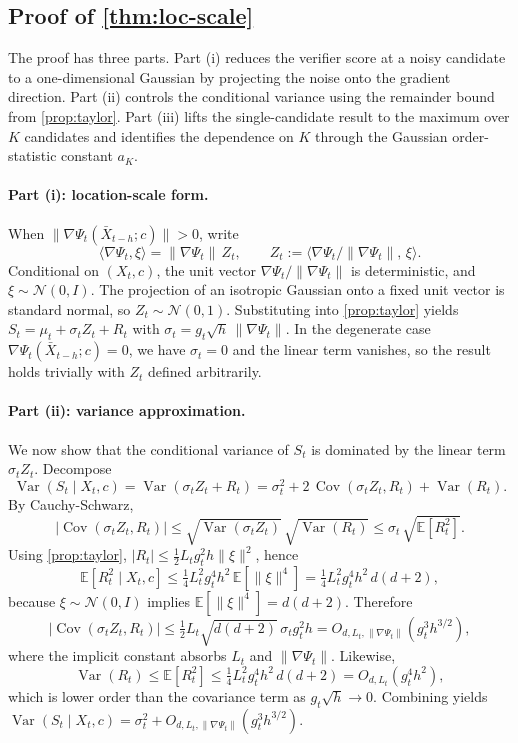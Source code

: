 \subsection{Proof of \texorpdfstring{\cref{thm:loc-scale}}{Theorem 5 (Location-Scale Structure)}}
\label{sec:proof-loc-scale}
%
The proof has three parts. Part (i) reduces the verifier score at a noisy candidate to a one-dimensional Gaussian by projecting the noise onto the gradient direction. Part (ii) controls the conditional variance using the remainder bound from \cref{prop:taylor}. Part (iii) lifts the single-candidate result to the maximum over $K$ candidates and identifies the dependence on $K$ through the Gaussian order-statistic constant $a_K$.
%
\paragraph{Part (i): location-scale form.}
When $\|\nabla\Psi_t(\bar{X}_{t-h}; c)\| > 0$, write
\[
  \langle \nabla\Psi_t, \xi \rangle = \|\nabla\Psi_t\|\,Z_t,
  \qquad
  Z_t := \langle \nabla\Psi_t / \|\nabla\Psi_t\|,\, \xi \rangle.
\]
Conditional on $(X_t, c)$, the unit vector $\nabla\Psi_t / \|\nabla\Psi_t\|$ is deterministic, and $\xi \sim \mathcal{N}(0, I)$. The projection of an isotropic Gaussian onto a fixed unit vector is standard normal, so $Z_t \sim \mathcal{N}(0,1)$. Substituting into \cref{prop:taylor} yields $S_t = \mu_t + \sigma_t Z_t + R_t$ with $\sigma_t = g_t\sqrt{h}\,\|\nabla\Psi_t\|$. In the degenerate case $\nabla\Psi_t(\bar{X}_{t-h}; c) = 0$, we have $\sigma_t = 0$ and the linear term vanishes, so the result holds trivially with $Z_t$ defined arbitrarily.
%
\paragraph{Part (ii): variance approximation.}
We now show that the conditional variance of $S_t$ is dominated by the linear term $\sigma_t Z_t$. Decompose
\[
  \operatorname{Var}(S_t \mid X_t, c) = \operatorname{Var}(\sigma_t Z_t + R_t) = \sigma_t^2 + 2\,\operatorname{Cov}(\sigma_t Z_t, R_t) + \operatorname{Var}(R_t).
\]
By Cauchy-Schwarz,
\[
  |\operatorname{Cov}(\sigma_t Z_t, R_t)| \le \sqrt{\operatorname{Var}(\sigma_t Z_t)}\,\sqrt{\operatorname{Var}(R_t)} \le \sigma_t\,\sqrt{\mathbb{E}[R_t^2]}.
\]
Using \cref{prop:taylor}, $|R_t| \le \tfrac{1}{2}L_t g_t^2 h \|\xi\|^2$, hence
\[
  \mathbb{E}[R_t^2 \mid X_t, c] \le \tfrac{1}{4}L_t^2 g_t^4 h^2\,\mathbb{E}[\|\xi\|^4] = \tfrac{1}{4}L_t^2 g_t^4 h^2\,d(d+2),
\]
because $\xi\sim\mathcal{N}(0,I)$ implies $\mathbb{E}[\|\xi\|^4] = d(d+2)$. Therefore
\[
  |\operatorname{Cov}(\sigma_t Z_t, R_t)| \le \tfrac{1}{2}L_t\sqrt{d(d+2)}\,\sigma_t g_t^2 h = O_{d, L_t, \|\nabla\Psi_t\|}(g_t^3 h^{3/2}),
\]
where the implicit constant absorbs $L_t$ and $\|\nabla\Psi_t\|$. Likewise,
\[
  \operatorname{Var}(R_t) \le \mathbb{E}[R_t^2] \le \tfrac{1}{4}L_t^2 g_t^4 h^2\,d(d+2) = O_{d, L_t}(g_t^4 h^2),
\]
which is lower order than the covariance term as $g_t\sqrt{h}\to 0$. Combining yields $\operatorname{Var}(S_t \mid X_t, c) = \sigma_t^2 + O_{d, L_t, \|\nabla\Psi_t\|}(g_t^3 h^{3/2})$.
%

